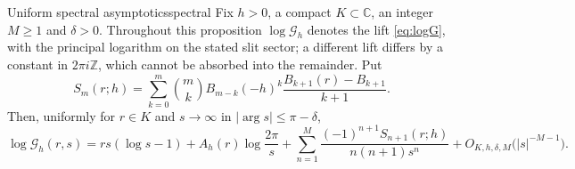 \documentclass[11pt,letterpaper]{article}
\newcommand{\Gc}{\mathcal{G}}               %
\newcommand{\Zint}{\mathbb{Z}}
\newcommand{\Cc}{\mathbb{C}}
\begin{document}
\begin{proposition}{Uniform spectral asymptotics}{spectral}
Fix $h>0$, a compact $K\subset\Cc$, an integer $M\ge1$ and $\delta>0$.
Throughout this proposition $\log\Gc_h$ denotes the lift \eqref{eq:logG}, with
the principal logarithm on the stated slit sector; a different lift differs by a
constant in $2\pi i\Zint$, which cannot be absorbed into the remainder. Put
\begin{equation}
  S_m(r;h)=\sum_{k=0}^{m}\binom{m}{k}B_{m-k}(-h)^{k}
  \frac{B_{k+1}(r)-B_{k+1}}{k+1}.
  \label{eq:Sm}
\end{equation}
Then, uniformly for $r\in K$ and $s\to\infty$ in
$\lvert\arg s\rvert\le\pi-\delta$,
\begin{equation}
  \log\Gc_h(r,s)=rs(\log s-1)+A_h(r)\log\frac{2\pi}{s}
  +\sum_{n=1}^{M}\frac{(-1)^{n+1}S_{n+1}(r;h)}{n(n+1)s^{n}}
  +O_{K,h,\delta,M}\bigl(|s|^{-M-1}\bigr).
  \label{eq:larges}
\end{equation}
\end{proposition}
\end{document}
